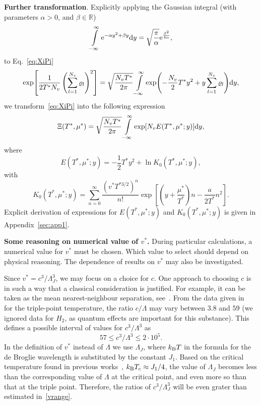 \documentclass[12pt]{article}
\numberwithin{equation}{section}
\begin{document}
	\textbf{Further transformation}. Explicitly applying the Gaussian integral (with parameters $\alpha > 0$, and $\beta \in \mathbb{R}$)
	\begin{equation}
		\int\limits_{-\infty}^{\infty} {\rm e}^{-\alpha y^2 + \beta y} {\rm d}y = \sqrt{\frac{\pi}{\alpha}} {\rm e}^{\frac{\beta^2}{4\alpha}},
	\end{equation}
	to Eq.~\eqref{eq:XiPi}
	\begin{equation}
		\label{eq:gaussInt}
		\exp[\frac{1}{2 T^* N_v}\left(\sum_{l=1}^{N_v} \varrho_l\right)^2] = \sqrt{\frac{N_v T^*}{2\pi}}
		\int\limits_{-\infty}^{\infty} \exp(-\frac{N_v}{2} T^* y^2 + y\sum_{l=1}^{N_v} \varrho_l) {\rm d}y,
	\end{equation}
	we transform~\eqref{eq:XiPi} into the following expression
	\begin{equation}
		\label{eq:XiInty}
		\Xi (T^*, \mu^*) = \sqrt{\frac{N_v T^*}{2\pi}} \int\limits_{-\infty}^{\infty} \exp[N_v E(T^*, \mu^*; y)] {\rm d} y,
	\end{equation}
	where 
	\begin{equation}
		\label{def:E}
		E(T^*,\mu^*; y) = -\frac12T^*y^2 + \ln K_0(T^*,\mu^*; y),
	\end{equation}
	with
	\begin{equation}
		\label{def:K}
		K_0(T^*,\mu^*; y) = \sum_{n=0}^{\infty} \frac{\left(v^* T^{*3/2}\right)^n}{n!} \exp[\left(y+\frac{\mu^*}{T^*}\right)n - \frac{a}{2T^*}n^2].
	\end{equation}
	Explicit derivation of expressions for $E(T^*,\mu^*;y)$ and $K_0(T^*,\mu^*;y)$ is given in Appendix~\ref{sec:app1}.
	
	\textbf{Some reasoning on numerical value of $v^*$.} During particular calculations, a numerical value for $v^*$ must be chosen. Which value to select should depend on physical reasoning. The dependence of results on $v^*$ may also be investigated.
	
	Since $v^* = c^3/\Lambda_J^3$, we may focus on a choice for $c$. One approach to choosing $c$ is in such a way that a classical consideration is justified. For example, it can be taken as the mean nearest-neighbour separation, see~\cite[Sec.~1.1]{HansenMcDonald13}. From the data given in~\cite[Table~1.1]{HansenMcDonald13} for the triple-point temperature, the ratio $c/\Lambda$ may vary between $3.8$ and $59$ (we ignored data for $H_2$, as quantum effects are important for this substance). This defines a possible interval of values for $c^3/\Lambda^3$ as
	\begin{equation}
		\label{vrange}
		57 \leq c^3/\Lambda^3 \leq 2 \cdot 10^5.
	\end{equation}
	In the definition of $v^*$ instead of $\Lambda$ we use $\Lambda_J$, where $k_{\rm B} T$ in the formula for the de Broglie wavelength is substituted by the constant $J_1$. Based on the critical temperature found in previous works~\cite{KKD18, KKD20, KD22}, $k_{\rm B}T_c \approx J_1/4$, the value of $\Lambda_J$ becomes less than the corresponding value of $\Lambda$ at the critical point, and even more so than that at the triple point. Therefore, the ratios of $c^3/\Lambda_J^3$ will be even grater than estimated in~\eqref{vrange}. 
	
\end{document}
